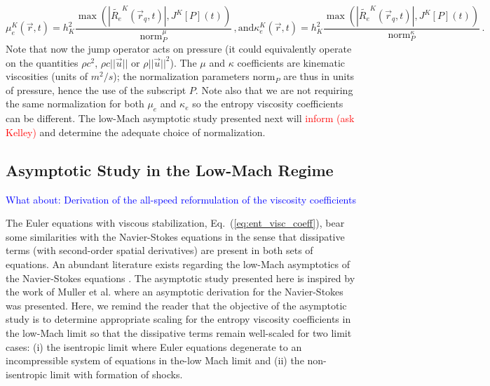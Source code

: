 \documentclass[preprint,10pt]{elsarticle}
\newcommand{\norm}{\textrm{norm}}
\newcommand{\resi}{R_e}
\newcommand{\resinew}{\widetilde{\resi}}
\newcommand{\eqt}[1]{Eq.~(\ref{#1})}                     %
\newcommand{\tcr}[1]{\textcolor{red}{#1}}
\newcommand{\tcb}[1]{\textcolor{blue}{#1}}
\begin{document}
%
\begin{subequations}
\label{eq:visc_definition}
\begin{equation}
\mu^K_e(\vec{r},t)    = h_K^2 \frac{\max\left( | \resinew^K(\vec{r}_q,t) |, J^K[P](t) \right)}{\norm_P^\mu}    \, ,
\end{equation} 
\text{and} 
\begin{equation}
\kappa^K_e(\vec{r},t) = h_K^2 \frac{\max\left( | \resinew^K(\vec{r}_q,t) |, J^K[P](t) \right)}{\norm_P^\kappa} \, .
\end{equation}
\end{subequations}
%
Note that now the jump operator acts on pressure (it could equivalently operate on the quantities $\rho c^2$, $\rho c || \vec{u} ||$ or $\rho || \vec{u} ||^2$). The $\mu$ and $\kappa$ coefficients are kinematic viscosities (units of $m^2/s$); the normalization parameters $\norm_P$ are thus in units of pressure, hence the use of the subscript $P$.  Note also that we are not requiring the same normalization for both $\mu_e$ and $\kappa_e$ so the entropy viscosity coefficients can be different. The low-Mach asymptotic study presented next will \tcr{inform (ask Kelley)} and determine the adequate choice of normalization.

\subsection{Asymptotic Study in the Low-Mach Regime} \label{sec:lowMach}
\tcb{What about: Derivation of the all-speed reformulation of the viscosity coefficients }

The Euler equations with viscous stabilization, \eqt{eq:ent_visc_coeff}, bear some similarities with the Navier-Stokes equations in the sense that dissipative terms (with second-order spatial derivatives) are present in both sets of equations. An abundant literature exists regarding the low-Mach asymptotics of the Navier-Stokes equations \cite{LowMach1, LowMach2, LowMach3, Muller}.   
%
The asymptotic study presented here is inspired by the work of Muller et al. \cite{Muller} where an asymptotic derivation for the Navier-Stokes was presented. Here, we remind the reader that the objective of the asymptotic study is to determine appropriate scaling for the entropy viscosity coefficients in the low-Mach limit so that the dissipative terms remain well-scaled for two limit cases: (i) the isentropic limit where Euler equations degenerate to an incompressible system of equations in the-low Mach limit and (ii) the non-isentropic limit with formation of shocks.
\end{document}
